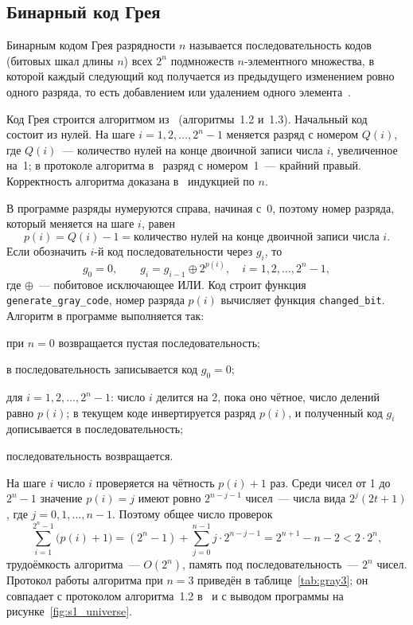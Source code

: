 \documentclass[14pt,a4paper]{extarticle}
\newcommand{\code}[1]{\texttt{#1}}
\newcommand{\us}{\_\allowbreak{}}
\begin{document}
\subsection{Бинарный код Грея}\label{sec:gray}

Бинарным кодом Грея разрядности $n$ называется последовательность кодов (битовых шкал длины $n$) всех $2^n$ подмножеств $n$-элементного множества, в которой каждый следующий код получается из предыдущего изменением ровно одного разряда, то есть добавлением или удалением одного элемента~\cite{novikov}.

Код Грея строится алгоритмом из~\cite{novikov} (алгоритмы~1.2 и~1.3). Начальный код состоит из нулей. На шаге $i = 1, 2, \ldots, 2^n - 1$ меняется разряд с номером $Q(i)$, где $Q(i)$~--- количество нулей на конце двоичной записи числа $i$, увеличенное на~1; в протоколе алгоритма в~\cite{novikov} разряд с номером~1~--- крайний правый. Корректность алгоритма доказана в~\cite{novikov} индукцией по $n$.

В программе разряды нумеруются справа, начиная с~0, поэтому номер разряда, который меняется на шаге $i$, равен
\begin{equation}\label{eq:p}
p(i) = Q(i) - 1 = \text{количество нулей на конце двоичной записи числа } i .
\end{equation}
Если обозначить $i$-й код последовательности через $g_i$, то
\begin{equation}\label{eq:gray}
g_0 = 0, \qquad g_i = g_{i-1} \oplus 2^{p(i)}, \quad i = 1, 2, \ldots, 2^n - 1,
\end{equation}
где $\oplus$~--- побитовое исключающее ИЛИ. Код строит функция \code{generate\us{}gray\us{}code}, номер разряда $p(i)$ вычисляет функция \code{changed\us{}bit}. Алгоритм в программе выполняется так:
\begin{steps}
\item при $n = 0$ возвращается пустая последовательность;
\item в последовательность записывается код $g_0 = 0$;
\item для $i = 1, 2, \ldots, 2^n - 1$: число $i$ делится на 2, пока оно чётное, число делений равно $p(i)$; в текущем коде инвертируется разряд $p(i)$, и полученный код $g_i$ дописывается в последовательность;
\item последовательность возвращается.
\end{steps}

На шаге $i$ число $i$ проверяется на чётность $p(i) + 1$ раз. Среди чисел от 1 до $2^n - 1$ значение $p(i) = j$ имеют ровно $2^{n-j-1}$ чисел~--- числа вида $2^j (2t + 1)$, где $j = 0, 1, \ldots, n - 1$. Поэтому общее число проверок
\begin{equation}\label{eq:cost}
\sum_{i=1}^{2^n - 1} \bigl(p(i) + 1\bigr) = (2^n - 1) + \sum_{j=0}^{n-1} j \cdot 2^{n-j-1} = 2^{n+1} - n - 2 < 2 \cdot 2^n,
\end{equation}
трудоёмкость алгоритма~--- $O(2^n)$, память под последовательность~--- $2^n$ чисел. Протокол работы алгоритма при $n = 3$ приведён в таблице~\ref{tab:gray3}; он совпадает с протоколом алгоритма~1.2 в~\cite{novikov} и с выводом программы на рисунке~\ref{fig:s1_universe}.
\end{document}
